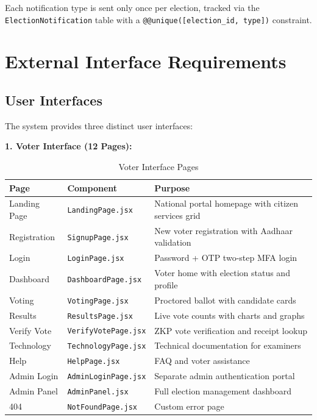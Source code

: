 \documentclass[oneside,a4paper,12pt]{book}
\begin{document}
Each notification type is sent only once per election, tracked via the \texttt{ElectionNotification} table with a \texttt{@@unique([election\_id, type])} constraint.

\section{External Interface Requirements}

\subsection{User Interfaces}
The system provides three distinct user interfaces:

\textbf{1. Voter Interface (12 Pages):}

\begin{table}[htbp]
\centering
\renewcommand{\arraystretch}{1.2}
\small
\begin{tabularx}{\textwidth}{|p{3cm}|p{3.5cm}|X|}
\hline
\textbf{Page} & \textbf{Component} & \textbf{Purpose} \\
\hline
Landing Page & \texttt{LandingPage.jsx} & National portal homepage with citizen services grid \\
\hline
Registration & \texttt{SignupPage.jsx} & New voter registration with Aadhaar validation \\
\hline
Login & \texttt{LoginPage.jsx} & Password + OTP two-step MFA login \\
\hline
Dashboard & \texttt{DashboardPage.jsx} & Voter home with election status and profile \\
\hline
Voting & \texttt{VotingPage.jsx} & Proctored ballot with candidate cards \\
\hline
Results & \texttt{ResultsPage.jsx} & Live vote counts with charts and graphs \\
\hline
Verify Vote & \texttt{VerifyVotePage.jsx} & ZKP vote verification and receipt lookup \\
\hline
Technology & \texttt{TechnologyPage.jsx} & Technical documentation for examiners \\
\hline
Help & \texttt{HelpPage.jsx} & FAQ and voter assistance \\
\hline
Admin Login & \texttt{AdminLoginPage.jsx} & Separate admin authentication portal \\
\hline
Admin Panel & \texttt{AdminPanel.jsx} & Full election management dashboard \\
\hline
404 & \texttt{NotFoundPage.jsx} & Custom error page \\
\hline
\end{tabularx}
\caption{Voter Interface Pages}
\label{tab:voter_pages}
\end{table}
\end{document}
